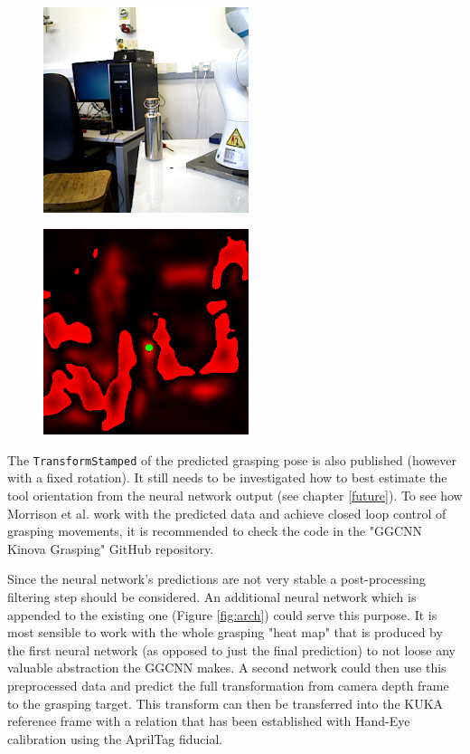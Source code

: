 \documentclass[headsepline,footinclude=false,fontsize=11pt,paper=a4,listof=totoc,bibliography=totoc,BCOR=12mm,DIV=14]{scrbook}
\begin{document}
\begin{figure} [h]
\centering
\begin{minipage}{.4\textwidth}
  \centering
  \includegraphics[height=6cm]{figures/pred_bottle_rgb}
\end{minipage}
\begin{minipage}{.4\textwidth}
  \centering
  \includegraphics[height=6cm]{figures/pred_bottle}
  \label{img:bottle_pred}
\end{minipage}
\end{figure}

The \texttt{TransformStamped} of the predicted grasping pose is also published (however with a fixed rotation). It still needs to be investigated how to best estimate the tool orientation from the neural network output (see chapter \ref{future}). To see how Morrison et al. work with the predicted data and achieve closed loop control of grasping movements, it is recommended to check the code in the "GGCNN Kinova Grasping" GitHub repository.

Since the neural network's predictions are not very stable a post-processing filtering step should be considered. An additional neural network which is appended to the existing one (Figure \ref{fig:arch}) could serve this purpose. It is most sensible to work with the whole grasping "heat map" that is produced by the first neural network (as opposed to just the final prediction) to not loose any valuable abstraction the GGCNN makes. A second network could then use this preprocessed data and predict the full transformation from camera depth frame to the grasping target. This transform can then be transferred into the KUKA reference frame with a relation that has been established with Hand-Eye calibration using the AprilTag fiducial.
\end{document}
